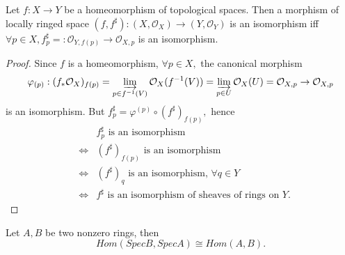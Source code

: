\begin{prop}
Let $f:X\rightarrow Y$ be a homeomorphism of topological spaces.
Then a morphism of locally ringed space $(f,f^{\sharp}):(X,\mathcal
{O}_X)\rightarrow (Y,\mathcal {O}_Y)$ is an isomorphism iff $\forall
p\in X, f^{\sharp}_p=:\mathcal {O}_{Y,f(p)}\rightarrow \mathcal
{O}_{X,p}$ is an isomorphism.
\end{prop}
\begin{proof}
Since $f$ is a homeomorphism, $\forall p\in X,$ the canonical
morphism
$$\varphi_{(p)}:(f_{\ast}\mathcal {O}_X)_{f(p)}=\varinjlim_{p\in f^{-1}(V)}\mathcal {O}_X(f^{-1}(V))=
\varinjlim_{p\in U}\mathcal {O}_X(U)=\mathcal
{O}_{X,p}\rightarrow\mathcal {O}_{X,p}$$ is an isomorphism. But
$f^{\sharp}_p=\varphi^{(p)}\circ(f^{\sharp})_{f(p)},$ hence
\begin{eqnarray*}
& & f^{\sharp}_p \text{ is an isomorphism}             \\
& \Longleftrightarrow & (f^{\sharp})_{f(p)} \text{ is an
isomorphism}                                           \\
& \Longleftrightarrow & (f^{\sharp})_q \text{ is an isomorphism, }
\forall q\in Y                                       \\
& \Longleftrightarrow & f^{\sharp} \text{ is an isomorphism of
sheaves of rings on }Y.
\end{eqnarray*}
\end{proof}
\begin{prop}
Let $A,B$ be two nonzero rings, then
$$Hom(SpecB,SpecA)\cong Hom(A,B).$$
\end{prop}

